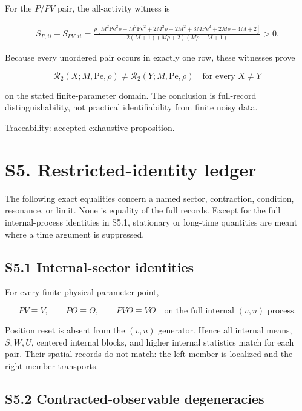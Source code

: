 For the \(P/PV\) pair, the all-activity witness is

\[
\begin{aligned}
S_{P,ii}-S_{PV,ii}
=
\frac{\rho\left[
M^2\mathrm{Pe}^2\rho+M^2\mathrm{Pe}^2+2M^2\rho+2M^2
+3M\mathrm{Pe}^2+2M\rho+4M+2\right]}
{2(M+1)(M\rho+2)(M\rho+M+1)}
>0 .
\end{aligned}
\]

Because every unordered pair occurs in exactly one row, these witnesses prove

\[
\boxed{
\mathcal R_2(X;M,\mathrm{Pe},\rho)
\ne
\mathcal R_2(Y;M,\mathrm{Pe},\rho)
\quad\text{for every }X\ne Y
}
\]

on the stated finite-parameter domain. The conclusion is full-record distinguishability, not practical identifiability from finite noisy data.

Traceability: \href{https://github.com/blakepi/phasemap-reproducibility/blob/v3.1.1/artifacts/derived/T-030-memory-channel-proposition.md}{accepted exhaustive proposition}.

\section{S5. Restricted-identity ledger}\label{s5.-restricted-identity-ledger}

The following exact equalities concern a named sector, contraction, condition, resonance, or limit. None is equality of the full records. Except for the full internal-process identities in S5.1, stationary or long-time quantities are meant where a time argument is suppressed.

\subsection{S5.1 Internal-sector identities}\label{s5.1-internal-sector-identities}

For every finite physical parameter point,

\[
PV\equiv V,\qquad
P\Theta\equiv\Theta,\qquad
PV\Theta\equiv V\Theta
\quad\text{on the full internal }(v,u)\text{ process}.
\]

Position reset is absent from the \((v,u)\) generator. Hence all internal means, \(S,W,U\), centered internal blocks, and higher internal statistics match for each pair. Their spatial records do not match: the left member is localized and the right member transports.

\subsection{S5.2 Contracted-observable degeneracies}\label{s5.2-contracted-observable-degeneracies}

